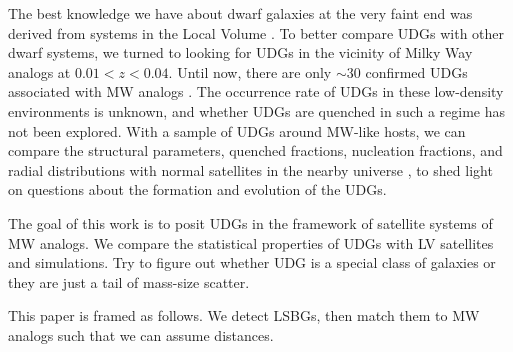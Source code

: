 \documentclass[twocolumn,astrosymb,twocolappendix]{aastex631}
\begin{document}
\begin{CJK*}{UTF8}{gbsn}
The best knowledge we have about dwarf galaxies at the very faint end was derived from systems in the Local Volume \citep[e.g.,][]{Simon2019,CarlstenELVES2022}. To better compare UDGs with other dwarf systems, we turned to looking for UDGs in the vicinity of Milky Way analogs at $0.01 < z < 0.04$. Until now, there are only $\sim 30$ confirmed UDGs associated with MW analogs \citep{Cohen2018,SAGA-II,CarlstenELVES2022}. The occurrence rate of UDGs in these low-density environments is unknown, and whether UDGs are quenched in such a regime has not been explored. With a sample of UDGs around MW-like hosts, we can compare the structural parameters, quenched fractions, nucleation fractions, and radial distributions with normal satellites in the nearby universe \citep[e.g.,][]{SAGA-II,CarlstenELVES2022}, to shed light on questions about the formation and evolution of the UDGs.

The goal of this work is to posit UDGs in the framework of satellite systems of MW analogs. We compare the statistical properties of UDGs with LV satellites and simulations. Try to figure out whether UDG is a special class of galaxies or they are just a tail of mass-size scatter. 

This paper is framed as follows. We detect LSBGs, then match them to MW analogs such that we can assume distances. 



\end{CJK*}
\end{document}
